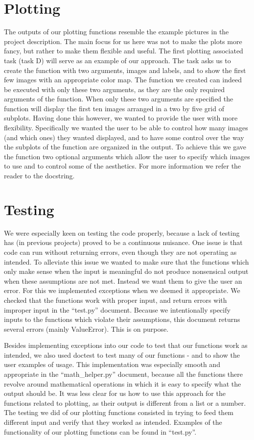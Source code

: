 \documentclass[letterpaper, 12 pt, conference]{ieeeconf}
\begin{document}
\section{Plotting}

The outputs of our plotting functions resemble the example pictures in the project description. The main focus for us here was not to make the plots more fancy, but rather to make them flexible and useful. The first plotting associated task (task D) will serve as an example of our approach. The task asks us to create the function with two arguments, images and labels, and to show the first few images with an appropriate color map. The function we created can indeed be executed with only these two arguments, as they are the only required arguments of the function. When only these two arguments are specified the function will display the first ten images arranged in a two by five grid of subplots. Having done this however, we wanted to provide the user with more flexibility. Specifically we wanted the user to be able to control how many images (and which ones) they wanted displayed, and to have some control over the way the subplots of the function are organized in the output. To achieve this we gave the function two optional arguments which allow the user to specify which images to use and to control some of the aesthetics. For more information we refer the reader to the docstring. 

\section{Testing}

We were especially keen on testing the code properly, because a lack of testing has (in previous projects) proved to be a continuous nuisance. One issue is that code can run without returning errors, even though they are not operating as intended. To alleviate this issue we wanted to make sure that the functions which only make sense when the input is meaningful do not produce nonsensical output when these assumptions are not met. Instead we want them to give the user an error. For this we implemented exceptions when we deemed it appropriate. We checked that the functions work with proper input, and return errors with improper input in the “test.py” document. Because we intentionally specify inputs to the functions which violate their assumptions, this document returns several errors (mainly ValueError). This is on purpose. 

Besides implementing exceptions into our code to test that our functions work as intended, we also used doctest to test many of our functions - and to show the user examples of usage. This implementation was especially smooth and appropriate in the “math\_helper.py” document, because all the functions there revolve around mathematical operations in which it is easy to specify what the output should be. It was less clear for us how to use this approach for the functions related to plotting, as their output is different from a list or a number. The testing we did of our plotting functions consisted in trying to feed them different input and verify that they worked as intended. Examples of the functionality of our plotting functions can be found in “test.py”. 
\end{document}

